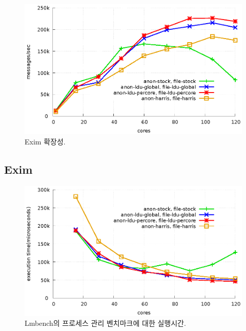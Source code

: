 \begin{figure}[tb]
  \begin{center}
    \includegraphics[scale=0.8]{graph/exim.eps}
  \end{center}
  \caption{Exim 확장성.}
  \label{fig:exim}
\end{figure}

\subsection{Exim}

\begin{figure}[tb]
  \begin{center}
    \includegraphics[scale=0.8]{graph/lmbench.eps}
  \end{center}
  \caption{Lmbench의 프로세스 관리 벤치마크에 대한 실행시간.}
  \label{fig:MicroBench}
\end{figure}

